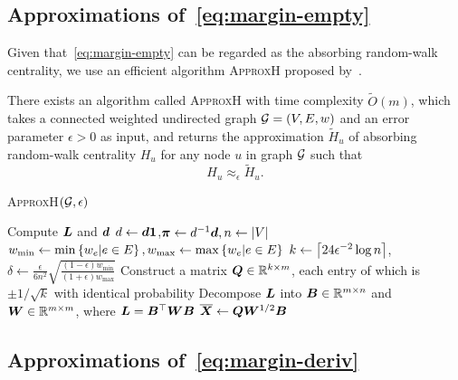 \documentclass[sigconf]{acmart}
\begin{document}
\subsection{Approximations of~\eqref{eq:margin-empty}}\label{subsec:approx-margin-empty}

Given that~\eqref{eq:margin-empty} can be regarded as the absorbing random-walk centrality, we use an efficient algorithm \textsc{ApproxH} proposed by~\cite{ZhXuZh20}.
\begin{lemma}\label{lem:approxhk}
    There exists an algorithm called \textsc{ApproxH} with time complexity \(\tilde{O}(m)\), which takes a connected weighted undirected graph \(\mathcal{G}=(V,E,w)\) and an error parameter \(\epsilon>0\) as input, and returns the approximation \(\tilde{H}_u\) of absorbing random-walk centrality \(H_u\) for any node \(u\) in graph \(\mathcal{G}\) such that
    \[H_u\approx_\epsilon\tilde{H}_u.\]
\end{lemma}

\begin{algorithm}
    \caption{\textsc{ApproxH}\((\mathcal{G},\epsilon)\)}
    \label{algo:approxh}
    Compute \(\boldsymbol{L}\) and \(\boldsymbol{d}\)\;
    \(d\gets\boldsymbol{d}\boldsymbol{1}\),\(\boldsymbol{\pi}\gets d^{-1}\boldsymbol{d},n\gets\left|V \right|\)\;
    \(w_{\min}\gets\min\left\{w_e|e\in E \right\},w_{\max}\gets\max\left\{w_e|e\in E \right\}\)\;
    \(k\gets\left\lceil24\epsilon^{-2}\log n\right\rceil\),\(\delta\gets\frac{\epsilon}{6n^2}\sqrt{\frac{(1-\epsilon)w_{\min}}{(1+\epsilon)w_{\max}}}\)\;
    Construct a matrix \(\boldsymbol{Q}\in\mathbb{R}^{k\times m}\), each entry of which is \(\pm1/\sqrt k\) with identical probability\;
    Decompose \(\boldsymbol{L}\) into \(\boldsymbol{B}\in\mathbb{R}^{m\times n}\) and \(\boldsymbol{W}\in\mathbb{R}^{m\times m}\), where \(\boldsymbol{L}=\boldsymbol{B}^\top\boldsymbol{W}\boldsymbol{B}\)\;
    \(\overline{\boldsymbol{X}}\gets\boldsymbol{Q}\boldsymbol{W}^{1/2}\boldsymbol{B}\)\;

\end{algorithm}

\subsection{Approximations of~\eqref{eq:margin-deriv}}
\end{document}

